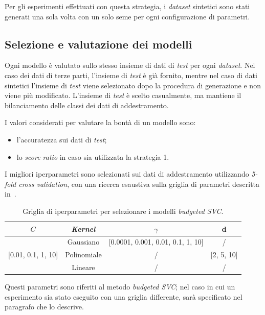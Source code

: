 Per gli esperimenti effettuati con questa strategia, i \emph{dataset} sintetici sono stati generati una sola volta con un solo seme per ogni configurazione di parametri.

\subsection{Selezione e valutazione dei modelli}
Ogni modello è valutato sullo stesso insieme di dati di \emph{test} per ogni \emph{dataset}.
Nel caso dei dati di terze parti, l'insieme di \emph{test} è già fornito, mentre nel caso di dati sintetici l'insieme di \emph{test} viene selezionato dopo la procedura di generazione e non viene più modificato.
L'insieme di \emph{test} è scelto casualmente, ma mantiene il bilanciamento delle classi dei dati di addestramento.

I valori considerati per valutare la bontà di un modello sono:
\begin{itemize}
    \item l'accuratezza sui dati di \emph{test};
    \item lo \emph{score ratio} in caso sia utilizzata la strategia 1.
\end{itemize}

I migliori iperparametri sono selezionati sui dati di addestramento utilizzando \emph{5-fold cross validation}, con una ricerca esaustiva sulla griglia di parametri descritta in~.
\begin{table}
    \centering
    \begin{tabular}{cccc}
        \toprule
        $C$ & \emph{Kernel} & $\gamma$ & d \\
        \midrule
        \multirow{3}{*}{[0.01, 0.1, 1, 10]} & Gaussiano   & [0.0001, 0.001, 0.01, 0.1, 1, 10]   & /\\
                                            \cline{2-4}
                                            & Polinomiale   & / & [2, 5, 10] \\
                                            \cline{2-4}
                                            & Lineare       & / & / \\
        \bottomrule
    \end{tabular}
    \caption{Griglia di iperparametri per selezionare i modelli \emph{budgeted SVC}.}
    \label{tab:gridsearch_2d}
\end{table}
Questi parametri sono riferiti al metodo \emph{budgeted SVC}; nel caso in cui un esperimento sia stato eseguito con una griglia differente, sarà specificato nel paragrafo che lo descrive.

